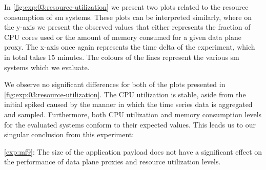 In \cref{fig:exp:03:resource-utilization} we present two plots related to the resource consumption of \gls{sm} systems. These plots can be interpreted similarly, where on the y-axis we present the observed values that either represents the fraction of CPU cores used or the amount of memory consumed for a given data plane proxy. The x-axis once again represents the time delta of the experiment, which in total takes 15 minutes. The colours of the lines represent the various \gls{sm} systems which we evaluate.

We observe no significant differences for both of the plots presented in \cref{fig:exp:03:resource-utilization}. The CPU utilization is stable, aside from the initial spiked caused by the manner in which the time series data is aggregated and sampled. Furthermore, both CPU utilization and memory consumption levels for the evaluated systems conform to their expected values. This leads us to our singular conclusion from this experiment:

\begin{shaded*}
    \noindent
    \ref{exp:mf9}:
    The size of the application payload does not have a significant effect on the performance of data plane proxies and resource utilization levels.
\end{shaded*}

